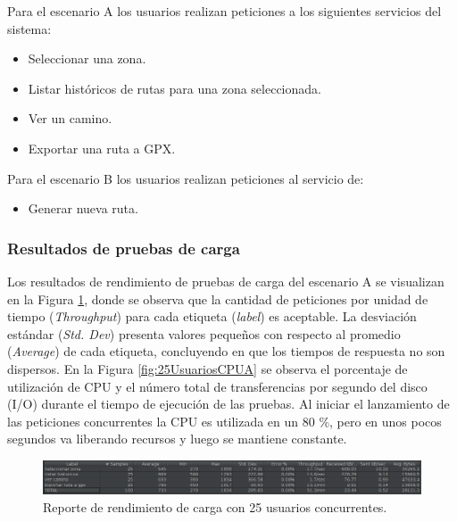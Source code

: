 Para el escenario A los usuarios realizan peticiones a los siguientes servicios del sistema:
\begin{itemize}
    \item Seleccionar una zona.
    \item Listar históricos de rutas para una zona seleccionada.
    \item Ver un camino.
    \item Exportar una ruta a GPX.
\end{itemize}

Para el escenario B los usuarios realizan peticiones al servicio de:
\begin{itemize}
    \item Generar nueva ruta.
\end{itemize}

\subsubsection{Resultados de pruebas de carga}
\label{ref:resultadosPruebaCarga}

Los resultados de rendimiento de pruebas de carga del escenario A se visualizan en la Figura \ref{fig:25UsuariosCargaA}, donde se observa que la cantidad de peticiones por unidad de tiempo (\textit{Throughput}) para cada etiqueta (\textit{label}) es aceptable. La desviación estándar (\textit{Std. Dev}) presenta valores pequeños con respecto al promedio (\textit{Average}) de cada etiqueta, concluyendo en que los tiempos de respuesta no son dispersos. En la Figura \ref{fig:25UsuariosCPUA} se observa el porcentaje de utilización de CPU y el número total de transferencias por segundo del disco (I/O) durante el tiempo de ejecución de las pruebas. Al iniciar el lanzamiento de las peticiones concurrentes la CPU es utilizada en un 80 \%, pero en unos pocos segundos va liberando recursos y luego se mantiene constante.


\begin{figure}[H]
    \centering
    \includegraphics[width=\textwidth]{25_usuarios_editado.png}
    \caption{Reporte de rendimiento de carga con 25 usuarios concurrentes.}
    \label{fig:25UsuariosCargaA}
\end{figure}

